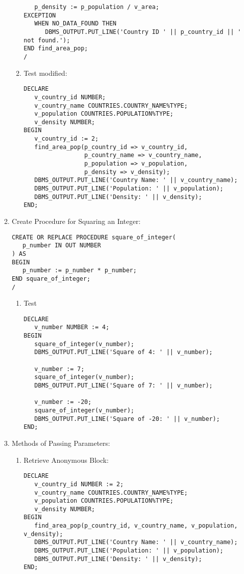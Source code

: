 \documentclass[11pt]{article}
\begin{document}
\begin{enumerate}
\begin{enumerate}
\begin{verbatim}
   p_density := p_population / v_area;
EXCEPTION
   WHEN NO_DATA_FOUND THEN
      DBMS_OUTPUT.PUT_LINE('Country ID ' || p_country_id || ' not found.');
END find_area_pop;
/
\end{verbatim}

\item Test modified:
\begin{verbatim}
DECLARE
   v_country_id NUMBER;
   v_country_name COUNTRIES.COUNTRY_NAME%TYPE;
   v_population COUNTRIES.POPULATION%TYPE;
   v_density NUMBER;
BEGIN
   v_country_id := 2;
   find_area_pop(p_country_id => v_country_id,
                 p_country_name => v_country_name,
                 p_population => v_population,
                 p_density => v_density);
   DBMS_OUTPUT.PUT_LINE('Country Name: ' || v_country_name);
   DBMS_OUTPUT.PUT_LINE('Population: ' || v_population);
   DBMS_OUTPUT.PUT_LINE('Density: ' || v_density);
END;
\end{verbatim}
\end{enumerate}

\item Create Procedure for Squaring an Integer:
\begin{verbatim}
CREATE OR REPLACE PROCEDURE square_of_integer(
   p_number IN OUT NUMBER
) AS
BEGIN
   p_number := p_number * p_number;
END square_of_integer;
/
\end{verbatim}

\begin{enumerate}
\item Test
\begin{verbatim}
DECLARE
   v_number NUMBER := 4;
BEGIN
   square_of_integer(v_number);
   DBMS_OUTPUT.PUT_LINE('Square of 4: ' || v_number);

   v_number := 7;
   square_of_integer(v_number);
   DBMS_OUTPUT.PUT_LINE('Square of 7: ' || v_number);

   v_number := -20;
   square_of_integer(v_number);
   DBMS_OUTPUT.PUT_LINE('Square of -20: ' || v_number);
END;
\end{verbatim}
\end{enumerate}

\item Methods of Passing Parameters:
\begin{enumerate}
\item Retrieve Anonymous Block:
\begin{verbatim}
DECLARE
   v_country_id NUMBER := 2;
   v_country_name COUNTRIES.COUNTRY_NAME%TYPE;
   v_population COUNTRIES.POPULATION%TYPE;
   v_density NUMBER;
BEGIN
   find_area_pop(p_country_id, v_country_name, v_population, v_density);
   DBMS_OUTPUT.PUT_LINE('Country Name: ' || v_country_name);
   DBMS_OUTPUT.PUT_LINE('Population: ' || v_population);
   DBMS_OUTPUT.PUT_LINE('Density: ' || v_density);
END;
\end{verbatim}


\end{enumerate}
\end{enumerate}
\end{document}

